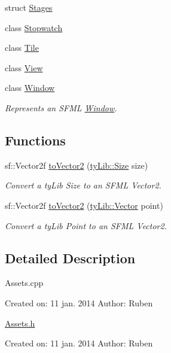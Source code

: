\begin{DoxyCompactItemize}
struct \hyperlink{structty_s_f_m_l_1_1_stages}{Stages}
\item 
class \hyperlink{classty_s_f_m_l_1_1_stopwatch}{Stopwatch}
\item 
class \hyperlink{classty_s_f_m_l_1_1_tile}{Tile}
\item 
class \hyperlink{classty_s_f_m_l_1_1_view}{View}
\item 
class \hyperlink{classty_s_f_m_l_1_1_window}{Window}
\begin{DoxyCompactList}\small\item\em Represents an S\+F\+M\+L \hyperlink{classty_s_f_m_l_1_1_window}{Window}. \end{DoxyCompactList}\end{DoxyCompactItemize}
\subsection*{Functions}
\begin{DoxyCompactItemize}
\item 
\hypertarget{namespacety_s_f_m_l_a2fa25fab481ab747c257b0f01c0f4919}{}sf\+::\+Vector2f \hyperlink{namespacety_s_f_m_l_a2fa25fab481ab747c257b0f01c0f4919}{to\+Vector2} (\hyperlink{classty_lib_1_1_size}{ty\+Lib\+::\+Size} size)\label{namespacety_s_f_m_l_a2fa25fab481ab747c257b0f01c0f4919}

\begin{DoxyCompactList}\small\item\em Convert a ty\+Lib Size to an S\+F\+M\+L Vector2. \end{DoxyCompactList}\item 
\hypertarget{namespacety_s_f_m_l_aeb28f154012b4965772a52ab40ff9362}{}sf\+::\+Vector2f \hyperlink{namespacety_s_f_m_l_aeb28f154012b4965772a52ab40ff9362}{to\+Vector2} (\hyperlink{classty_lib_1_1_vector}{ty\+Lib\+::\+Vector} point)\label{namespacety_s_f_m_l_aeb28f154012b4965772a52ab40ff9362}

\begin{DoxyCompactList}\small\item\em Convert a ty\+Lib Point to an S\+F\+M\+L Vector2. \end{DoxyCompactList}\end{DoxyCompactItemize}


\subsection{Detailed Description}
Assets.\+cpp

Created on\+: 11 jan. 2014 Author\+: Ruben

\hyperlink{_assets_8h_source}{Assets.\+h}

Created on\+: 11 jan. 2014 Author\+: Ruben 